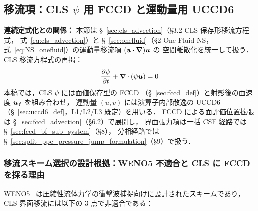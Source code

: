 %
%
\label{sec:discretization_modules}%
\label{sec:advection}%

\subsection{移流項：CLS \texorpdfstring{$\psi$}{ψ} 用 FCCD と運動量用 UCCD6}
\label{sec:advection_motivation}

\noindent\textbf{連続定式化との関係：}
本節は §~\ref{sec:cls_advection}（§3.2 CLS 保存形移流方程式，
式~\eqref{eq:cls_advection}）と §~\ref{sec:onefluid}（§2 One-Fluid NS，
式~\eqref{eq:NS_onefluid}）の運動量移流項 $(\bm{u}\cdot\bm{\nabla})\bm{u}$ の
空間離散化を統一して扱う．
CLS 移流方程式の再掲：
\begin{equation}
  \frac{\partial\psi}{\partial t} + \bm{\nabla}\cdot(\psi\bm{u}) = 0
  \label{eq:cls_advection_ref}
\end{equation}
本稿では，CLS $\psi$ には面値保存型の FCCD
（§~\ref{sec:fccd_def}）と射影後の面速度 $\bm{u}_f$ を組み合わせ，
運動量 $(u,v)$ には演算子内部散逸の
UCCD6（§~\ref{sec:uccd6_def}，L1/L2/L3 既定）を用いる．
FCCD による面評価位置拡張は §~\ref{sec:fccd_advection}（§6.2）で展開し，
界面張力項は一括 CSF 経路では §~\ref{sec:fccd_bf_sub_system}（§8），
分相経路では §~\ref{sec:split_ppe_pressure_jump_formulation}（§9）で扱う．

\subsubsection{移流スキーム選択の設計根拠：WENO5 不適合と CLS に FCCD を採る理由}
\label{sec:advection_weno5_critique}

WENO5~\cite{LiuOsherChan1994,JiangShu1996} は圧縮性流体力学の衝撃波捕捉向けに設計されたスキームであり，
CLS 界面移流には以下の 3 点で非適合である：

